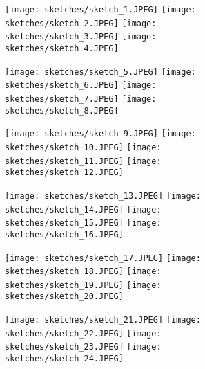 \documentclass{article}
\begin{document}
\begin{figure}
\centering 
\begin{subfigure}{.1\textwidth}
  \centering
  \texttt{[image: sketches/sketch\_1.JPEG]}
  \texttt{[image: sketches/sketch\_2.JPEG]}
  \texttt{[image: sketches/sketch\_3.JPEG]}
  \texttt{[image: sketches/sketch\_4.JPEG]}
  \caption{}
\end{subfigure}
\begin{subfigure}{.1\textwidth}
  \centering
  \texttt{[image: sketches/sketch\_5.JPEG]}
  \texttt{[image: sketches/sketch\_6.JPEG]}
  \texttt{[image: sketches/sketch\_7.JPEG]}
  \texttt{[image: sketches/sketch\_8.JPEG]}
  \caption{}
\end{subfigure}
\begin{subfigure}{.1\textwidth}
  \centering
  \texttt{[image: sketches/sketch\_9.JPEG]}
  \texttt{[image: sketches/sketch\_10.JPEG]}
  \texttt{[image: sketches/sketch\_11.JPEG]}
  \texttt{[image: sketches/sketch\_12.JPEG]}
  \caption{}
\end{subfigure}
\begin{subfigure}{.1\textwidth}
  \centering
  \texttt{[image: sketches/sketch\_13.JPEG]}
  \texttt{[image: sketches/sketch\_14.JPEG]}
  \texttt{[image: sketches/sketch\_15.JPEG]}
  \texttt{[image: sketches/sketch\_16.JPEG]}
  \caption{}
\end{subfigure}
\begin{subfigure}{.1\textwidth}
  \centering
  \texttt{[image: sketches/sketch\_17.JPEG]}
  \texttt{[image: sketches/sketch\_18.JPEG]}
  \texttt{[image: sketches/sketch\_19.JPEG]}
  \texttt{[image: sketches/sketch\_20.JPEG]}
  \caption{}
\end{subfigure}
\begin{subfigure}{.1\textwidth}
  \centering
  \texttt{[image: sketches/sketch\_21.JPEG]}
  \texttt{[image: sketches/sketch\_22.JPEG]}
  \texttt{[image: sketches/sketch\_23.JPEG]}
  \texttt{[image: sketches/sketch\_24.JPEG]}
  \caption{}
\end{subfigure}
\begin{subfigure}{.1\textwidth}

\end{subfigure}
\end{figure}
\end{document}
